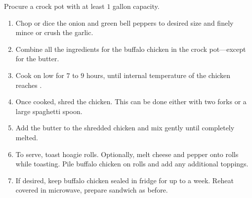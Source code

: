 \instructions
Procure a crock pot with at least $1$ gallon capacity.
\begin{enumerate}
    \item Chop or dice the onion and green bell peppers to desired size and finely mince or crush the garlic.
    \item Combine all the ingredients for the buffalo chicken in the crock pot---except for the butter.
    \item Cook on low for $7$ to $9$ hours, until internal temperature of the chicken reaches .
    \item Once cooked, shred the chicken. This can be done either with two forks or a large spaghetti spoon.
    \item Add the butter to the shredded chicken and mix gently until completely melted.
    \item To serve, toast hoagie rolls. Optionally, melt cheese and pepper onto rolls while toasting. Pile buffalo chicken on rolls and add any additional toppings.
    \item If desired, keep buffalo chicken sealed in fridge for up to a week. Reheat covered in microwave, prepare sandwich as before.
\end{enumerate}

\spewfootnotes


